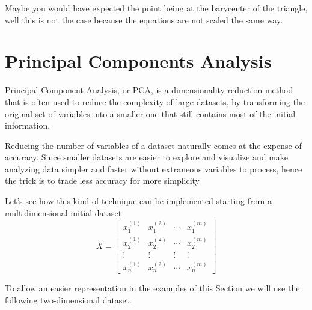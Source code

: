 Maybe you would have expected the point being at the barycenter of the
triangle, well this is not the case because the equations are not 
scaled the same way.



\section{Principal Components Analysis}
\label{sec:pca}

Principal Component Analysis, or PCA, is a dimensionality-reduction method that is often used to reduce the complexity of large datasets, by transforming the original set of variables into a smaller one that still contains most of the initial information.

Reducing the number of variables of a dataset naturally comes at the expense of accuracy. Since smaller datasets are easier to explore and visualize and make analyzing data simpler and faster without extraneous variables to process, hence the trick is to trade less accuracy for more simplicity

Let's see how this kind of technique can be implemented starting from 
a multidimensional initial dataset 
\begin{equation}
X=\begin{bmatrix}
x^{(1)}_1 &x^{(2)}_1&\cdots &x^{(m)}_1 \\
x^{(1)}_2 &x^{(2)}_2&\cdots &x^{(m)}_2 \\
\vdots &\vdots &\vdots &\vdots \\
x^{(1)}_n &x^{(2)}_n&\cdots &x^{(m)}_n 
\end{bmatrix}
\end{equation}

To allow an easier representation in the examples of this Section we will use the following two-dimensional dataset.

